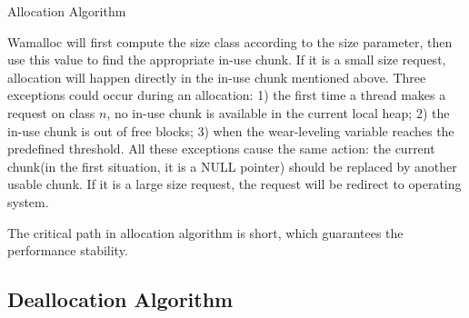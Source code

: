 \documentclass[10pt, conference, compsocconf]{IEEEtran}
\begin{document}
\begin{algorithm}
\caption{Allocation Algorithm}\label{euclid}
\end{algorithm}

Wamalloc will first compute the size class according to the size parameter, 
then use this value to find the appropriate in-use chunk.
If it is a small size request, allocation will happen directly in the in-use chunk mentioned above.
Three exceptions could occur during an allocation:
1) the first time a thread makes a request on class $n$, no in-use chunk is available in the current local heap;
2) the in-use chunk is out of free blocks;
3) when the wear-leveling variable reaches the predefined threshold.
All these exceptions cause the same action: the current chunk(in the first situation, it is a NULL pointer) should be replaced by another usable chunk.
If it is a large size request, the request will be redirect to operating system.

The critical path in allocation algorithm is short, which guarantees the performance stability.

\subsection{Deallocation Algorithm}
\end{document}
